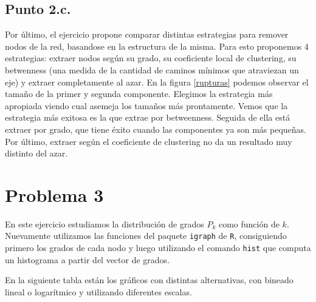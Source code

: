 \documentclass{article}
\begin{document}
\subsection{Punto 2.c.}
Por último, el ejercicio propone comparar distintas estrategias para remover nodos de la red, basandose en la estructura de la misma. Para esto proponemos 4 estrategias: extraer nodos según su grado, su coeficiente local de clustering, su betwenness (una medida de la cantidad de caminos mínimos que atraviezan un eje) y extraer completamente al azar. En la figura \ref{rupturas} podemos observar el tamaño de la primer y segunda componente. Elegimos la estrategia más apropiada viendo cual asemeja los tamaños más prontamente. Vemos que la estrategia más exitosa es la que extrae por betweenness. Seguida de ella está extraer por grado, que tiene éxito cuando las componentes ya son más pequeñas. Por último, extraer según el coeficiente de clustering no da un resultado muy distinto del azar.

\section{Problema 3}
En este ejercicio estudiamos la distribución de grados $P_k$ como función de $k$. Nuevamente utilizamos las funciones del paquete \texttt{igraph} de \texttt{R}, consiguiendo primero los grados de cada nodo y luego utilizando el comando \texttt{hist} 	que computa un histograma a partir del vector de grados.

En la siguiente tabla están los gráficos con distintas alternativas, con bineado lineal o logarítmico y utilizando diferentes escalas.
\end{document}

